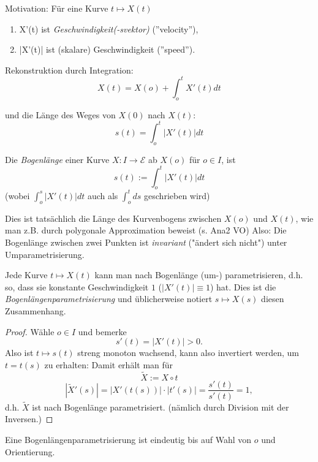 Motivation: Für eine Kurve $t \mapsto X(t)$ 
\begin{enumerate}
	\item X'(t) ist \emph{Geschwindigkeit(-svektor)} (''velocity''),
	\item |X'(t)| ist (skalare) Geschwindigkeit (''speed'').
\end{enumerate}

Rekonstruktion durch Integration:
\[X(t)= X(o) + \int_{o}^{t}X'(t)dt\]

und die Länge des Weges von $X(0)$ nach $X(t)$:
\[s(t) = \int_{o}^{t}|X'(t)|dt\]

\begin{definition}
	
	Die \emph{Bogenlänge} einer Kurve $X: I \rightarrow \mathcal{E}$ ab $X(o)$ für $o \in I$, ist
	\[s(t) := \int_{o}^{t}|X'(t)|dt\] (wobei $\int_{o}^{s}|X'(t)|dt$ auch als $\int_{o}^{t} ds$ geschrieben wird)
	
\end{definition}

\begin{remark}
	Dies ist tatsächlich die Länge des Kurvenbogens zwischen $X(o)$ und $X(t)$, wie man z.B. durch polygonale Approximation beweist (s. Ana2 VO)
	Also: Die Bogenlänge zwischen zwei Punkten ist \emph{invariant} ("ändert sich nicht")
	unter Umparametrisierung.
\end{remark}

\begin{lemma, definition}\label{umpar}
	Jede Kurve $t \mapsto X(t)$ kann man nach Bogenlänge (um-) parametrisieren, d.h. so, dass sie konstante Geschwindigkeit $1$ ($|X'(t)|\equiv 1$) hat.
	Dies ist die \emph{Bogenlängenparametrisierung} und üblicherweise notiert $s \mapsto X(s)$ diesen Zusammenhang.
\end{lemma, definition}
\begin{proof}
	Wähle $o \in I$ und bemerke \[s'(t) = |X'(t)| > 0.\]
	Also ist $t \mapsto s(t)$ streng monoton wachsend, kann also invertiert werden, um $t= t(s)$ zu erhalten: Damit erhält man für 
	\[\widetilde{X}:=X\circ t\]
	\[|\widetilde{X}'(s)|= |X'(t(s))| \cdot |t'(s)| = \frac{s'(t)}{s'(t)}= 1,\]
	d.h. $\widetilde{X}$ ist nach Bogenlänge parametrisiert. (nämlich durch Division mit der Inversen.)
\end{proof}

\begin{remark}
	Eine Bogenlängenparametrisierung ist eindeutig bis auf Wahl von $o$ und Orientierung.
\end{remark}

